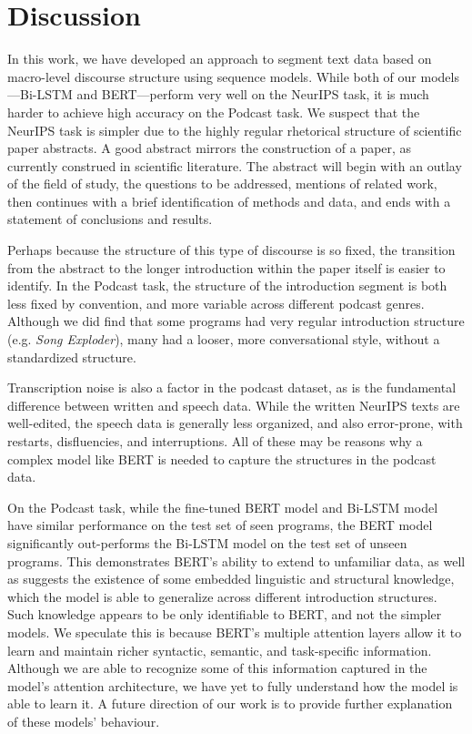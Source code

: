 \section{Discussion}\label{sec:discussion}


In this work, we have developed an approach to segment text data based on macro-level discourse structure using sequence models. While both of our models---Bi-LSTM and BERT---perform very well on the NeurIPS task, it is much harder to achieve high accuracy on the Podcast task. We suspect that the NeurIPS task is simpler due to the highly regular rhetorical structure of scientific paper abstracts. A good abstract mirrors the construction of a paper, as currently construed in scientific literature. The abstract will begin with an outlay of the field of study, the questions to be addressed, mentions of related work, then continues with a brief identification of methods and data, and ends with a statement of conclusions and results. 

Perhaps because the structure of this type of discourse is so fixed, the transition from the abstract to the longer introduction within the paper itself is easier to identify. In the Podcast task, the structure of the introduction segment is both less fixed by convention, and more variable across different podcast genres. Although we did find that some programs had very regular introduction structure (e.g. {\it Song Exploder}), many had a looser, more conversational style, without a standardized structure.

Transcription noise is also a factor in the podcast dataset, as is the fundamental difference between written and speech data. While the written NeurIPS texts are well-edited, the speech data is generally less organized, and also error-prone, with restarts, disfluencies, and interruptions. All of these may be reasons why a complex model like BERT is needed to capture the structures in the podcast data.


On the Podcast task, while the fine-tuned BERT model and Bi-LSTM model have similar performance on the test set of seen programs, the BERT model significantly out-performs the Bi-LSTM model on the test set of unseen programs. This demonstrates BERT's ability to extend to unfamiliar data, as well as suggests the existence of some embedded linguistic and structural knowledge, which the model is able to generalize across different introduction structures. Such knowledge appears to be only identifiable to BERT, and not the simpler models. We speculate this is because BERT's multiple attention layers allow it to learn and maintain richer syntactic, semantic, and task-specific information. Although we are able to recognize some of this information captured in the model's attention architecture, we have yet to fully understand how the model is able to learn it. A future direction of our work is to provide further explanation of these models' behaviour.